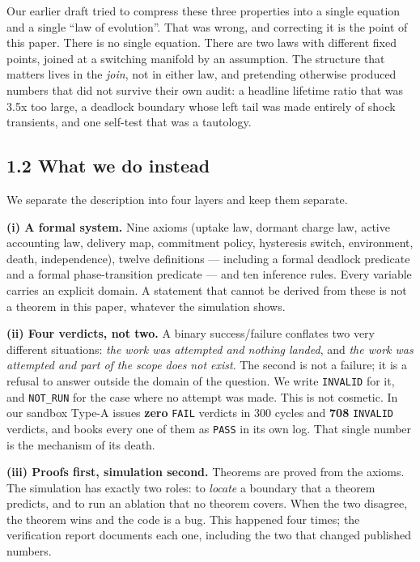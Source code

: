 \documentclass[11pt,a4paper]{article}
\begin{document}
Our earlier draft tried to compress these three properties into a single
equation and a single ``law of evolution''. That was wrong, and correcting it is
the point of this paper. There is no single equation. There are two laws with
different fixed points, joined at a switching manifold by an assumption. The
structure that matters lives in the \emph{join}, not in either law, and pretending
otherwise produced numbers that did not survive their own audit: a headline
lifetime ratio that was 3.5x too large, a deadlock boundary whose left tail was
made entirely of shock transients, and one self-test that was a tautology.

\subsection{1.2 What we do instead}\label{what-we-do-instead}

We separate the description into four layers and keep them separate.

\textbf{(i) A formal system.} Nine axioms (uptake law, dormant charge law, active
accounting law, delivery map, commitment policy, hysteresis switch, environment,
death, independence), twelve definitions --- including a formal deadlock predicate
and a formal phase-transition predicate --- and ten inference rules. Every variable
carries an explicit domain. A statement that cannot be derived from these is not
a theorem in this paper, whatever the simulation shows.

\textbf{(ii) Four verdicts, not two.} A binary success/failure conflates two very
different situations: \emph{the work was attempted and nothing landed}, and \emph{the work
was attempted and part of the scope does not exist}. The second is not a
failure; it is a refusal to answer outside the domain of the question. We write
\texttt{INVALID} for it, and \texttt{NOT\_RUN} for the case where no attempt was made. This is
not cosmetic. In our sandbox Type-A issues \textbf{zero} \texttt{FAIL} verdicts in 300 cycles
and \textbf{708} \texttt{INVALID} verdicts, and books every one of them as \texttt{PASS} in its own
log. That single number is the mechanism of its death.

\textbf{(iii) Proofs first, simulation second.} Theorems are proved from the axioms.
The simulation has exactly two roles: to \emph{locate} a boundary that a theorem
predicts, and to run an ablation that no theorem covers. When the two disagree,
the theorem wins and the code is a bug. This happened four times; the
verification report documents each one, including the two that changed published
numbers.
\end{document}
